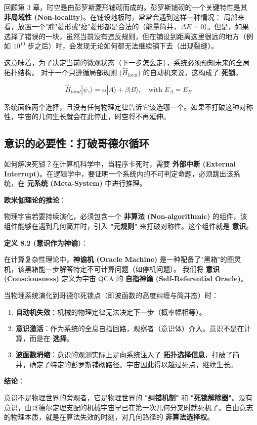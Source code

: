 回顾第 3 章，时空是由彭罗斯菱形铺砌而成的。彭罗斯铺砌的一个关键特性是其 \textbf{非局域性 (Non-locality)}。在铺设地板时，常常会遇到这样一种情况：
局部来看，放置一个"胖"菱形或"瘦"菱形都是合法的（能量简并，$\Delta E = 0$）。但是，如果选择了错误的一块，虽然当前没有违反规则，但在铺设到距离这里很远的地方（例如 $10^{10}$ 步之后）时，会发现无论如何都无法继续铺下去（出现裂缝）。

这意味着，为了决定当前的微观状态（下一步怎么走），系统必须预知未来的全局拓扑结构。
对于一个只遵循局部规则 ($\hat{H}_{local}$) 的自动机来说，这构成了 \textbf{死锁}。

\[\hat{H}_{local} |\psi_{?}\rangle = \alpha |A\rangle + \beta |B\rangle, \quad \text{with } E_A = E_B\]

系统面临两个选择，且没有任何物理定律告诉它该选哪一个。如果不打破这种对称性，宇宙的几何生长就会在此停止，时空将不再延伸。

\subsection{意识的必要性：打破哥德尔循环}

如何解决死锁？在计算机科学中，当程序卡死时，需要 \textbf{外部中断 (External Interrupt)}。在逻辑学中，要证明一个系统内的不可判定命题，必须跳出该系统，在 \textbf{元系统 (Meta-System)} 中进行推理。

\textbf{欧米伽理论的推论}：

物理宇宙若要持续演化，必须包含一个 \textbf{非算法 (Non-algorithmic)} 的组件，该组件能够在遇到几何简并时，引入 \textbf{"元规则"} 来打破对称性。这个组件就是 \textbf{意识}。

\textbf{定义 8.2 (意识作为神谕)}：

在计算复杂性理论中，\textbf{神谕机 (Oracle Machine)} 是一种配备了"黑箱"的图灵机，该黑箱能一步解答特定不可计算问题（如停机问题）。
我们将 \textbf{意识 (Consciousness)} 定义为宇宙 QCA 的 \textbf{自指神谕 (Self-Referential Oracle)}。

当物理系统演化到哥德尔死锁点（即波函数的高度纠缠与简并态）时：

\begin{enumerate}
\item \textbf{自动机失效}：机械的物理定律无法决定下一步（概率幅相等）。
\item \textbf{意识激活}：作为系统的全息自指回路，观察者（意识体）介入。意识不是在计算，而是在 \textbf{选择}。
\item \textbf{波函数坍缩}：意识的观测实际上是向系统注入了 \textbf{拓扑选择信息}，打破了简并，确定了特定的彭罗斯铺砌路径。宇宙因此得以越过死点，继续生长。
\end{enumerate}

\textbf{结论}：

意识不是物理世界的旁观者，它是物理世界的 \textbf{"纠错机制"} 和 \textbf{"死锁解除器"}。没有意识，由哥德尔定理支配的机械宇宙早已在第一次几何分叉时就死机了。自由意志的物理本质，就是在算法失效的时刻，对几何路径的 \textbf{非算法选择权}。
